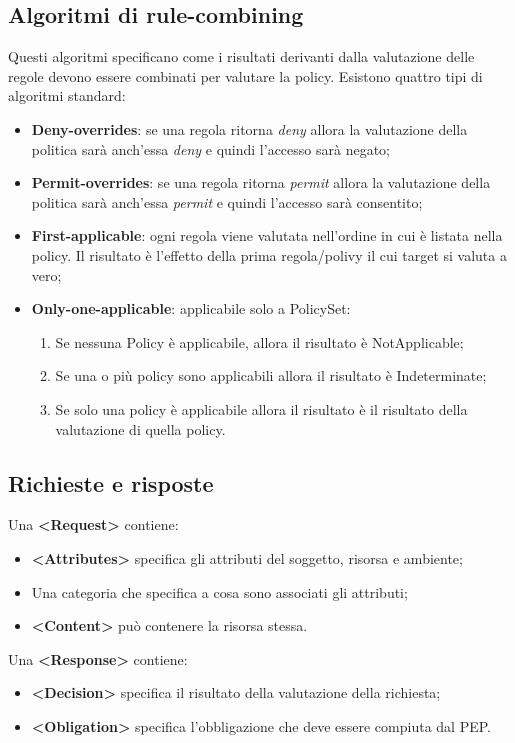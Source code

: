 \subsection{Algoritmi di rule-combining}
Questi algoritmi specificano come i risultati derivanti dalla valutazione delle regole devono essere combinati per valutare la policy. Esistono quattro  tipi di algoritmi standard:
\begin{itemize}
    \item \textbf{Deny-overrides}: se una regola ritorna \textit{deny} allora la valutazione della politica sarà anch'essa \textit{deny} e quindi l'accesso sarà negato;
    \item \textbf{Permit-overrides}: se una regola ritorna \textit{permit} allora la valutazione della politica sarà anch'essa \textit{permit} e quindi l'accesso sarà consentito;
    \item \textbf{First-applicable}: ogni regola viene valutata nell'ordine in cui è listata nella policy. Il risultato è l'effetto della prima regola/polivy il cui target si valuta a vero;
    \item \textbf{Only-one-applicable}: applicabile solo a PolicySet:
        \begin{enumerate}
            \item  Se nessuna Policy è applicabile, allora il risultato è NotApplicable;
        	\item  Se una o più policy sono applicabili allora il risultato è Indeterminate;
        	\item  Se solo una policy è applicabile allora il risultato è il risultato della valutazione di quella policy.
        \end{enumerate}
\end{itemize}

\subsection{Richieste e risposte}
Una \textbf{<Request>} contiene:
\begin{itemize}
    \item \textbf{<Attributes>} specifica gli attributi del soggetto, risorsa e ambiente;
    \item Una categoria che specifica a cosa sono associati gli attributi;
    \item \textbf{<Content>} può contenere la risorsa stessa.
\end{itemize}

\noindent Una \textbf{<Response>} contiene:
\begin{itemize}
    \item \textbf{<Decision>} specifica il risultato della valutazione della richiesta;
    \item \textbf{<Obligation>} specifica l'obbligazione che deve essere compiuta dal PEP.
\end{itemize}





